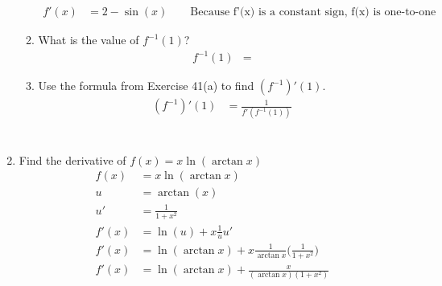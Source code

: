 \documentclass{article}
\begin{document}
\begin{enumerate}
\begin{enumerate}
			$$\begin{align}
				f'(x)&= 2-\sin(x) \qquad \text{Because f'(x) is a constant sign, f(x) is one-to-one}
			\end{align}$$
			\item What is the value of $f^{-1}(1)$?
			$$\begin{align}
				f^{-1}(1)&=
			\end{align}$$
			\item Use the formula from Exercise 41(a) to find $(f^{-1})'(1)$.
			$$\begin{align}
				(f^{-1})'(1)&=\frac{1}{f'(f^{-1}(1))}\\
				\\ \\ \\
			\end{align}$$
		\end{enumerate}
\setcounter{enumi}{21}
	\item Find the derivative of $f(x)=x\ln(\arctan x)$
	$$\begin{align}
		f(x)&=x\ln(\arctan x)\\
		u&=\arctan(x)\\
		u'&=\frac{1}{1+x^2}\\
		f'(x)&=\ln(u)+x\frac{1}{u}u'\\
		f'(x)&=\ln(\arctan x)+x\frac{1}{\arctan x}\Big(\frac{1}{1+x^2}\Big)\\
		f'(x)&=\ln(\arctan x)+\frac{x}{(\arctan x)(1+x^2)}
	\end{align}$$
\end{enumerate}


%
\end{document}
